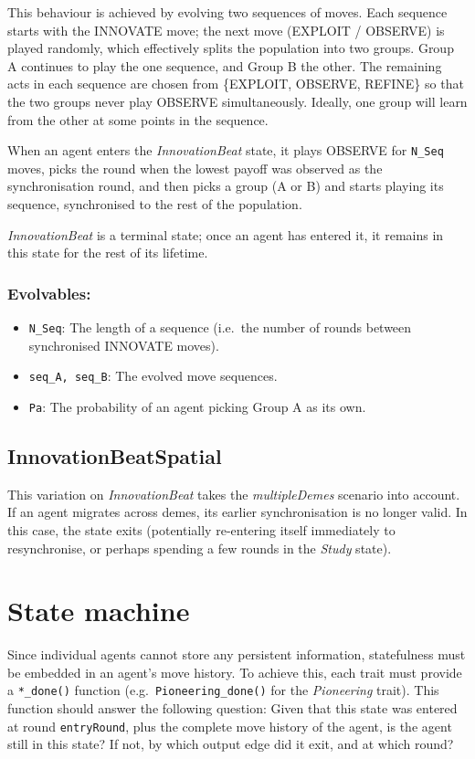 \documentclass[a4paper,10pt]{article}
\begin{document}
This behaviour is achieved by evolving two sequences of moves. Each sequence starts with the INNOVATE
move; the next move (EXPLOIT / OBSERVE) is played randomly, which effectively splits the population into
two groups. Group A continues to play the one sequence, and Group B the other. The remaining acts in
each sequence are chosen from \{EXPLOIT, OBSERVE, REFINE\} so that the two groups never play OBSERVE
simultaneously. Ideally, one group will learn from the other at some points in the sequence.

When an agent enters the \emph{InnovationBeat} state, it plays OBSERVE for \texttt{N\_Seq} moves, picks
the round when the lowest payoff was observed as the synchronisation round, and then picks a group (A or B)
and starts playing its sequence, synchronised to the rest of the population.

\emph{InnovationBeat} is a terminal state; once an agent has entered it, it remains in this state for the
rest of its lifetime.

\subsubsection*{Evolvables:}
\begin{itemize}
 \item \texttt{N\_Seq}: The length of a sequence (i.e.\ the number of rounds between synchronised
    INNOVATE moves).
 \item \texttt{seq\_A, seq\_B}: The evolved move sequences.
 \item \texttt{Pa}: The probability of an agent picking Group A as its own.
\end{itemize}

\subsection{InnovationBeatSpatial}
This variation on \emph{InnovationBeat} takes the \emph{multipleDemes} scenario into account. If an agent
migrates across demes, its earlier synchronisation is no longer valid. In this case, the state exits (potentially
re-entering itself immediately to resynchronise, or perhaps spending a few rounds in the \emph{Study} state).

\section{State machine}
Since individual agents cannot store any persistent information, statefulness must be embedded in an agent's
move history. To achieve this, each trait must provide a \texttt{*\_done()} function (e.g.\ \texttt{Pioneering\_done()}
for the \emph{Pioneering} trait). This function should answer the following question: Given that this state
was entered at round \texttt{entryRound}, plus the complete move history of the agent, is the agent still in
this state? If not, by which output edge did it exit, and at which round?
\end{document}
